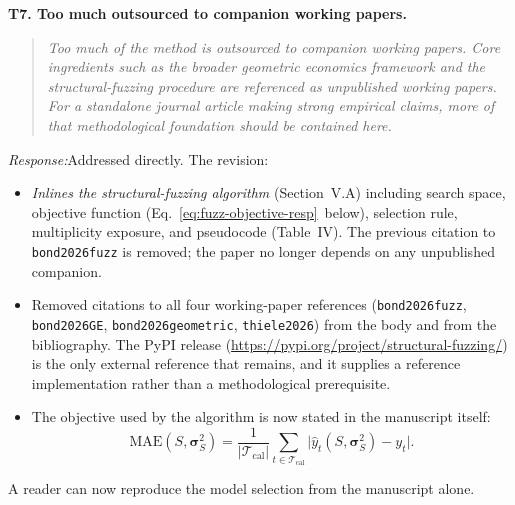\documentclass[11pt]{article}
\newcommand{\rev}[1]{\textbf{#1}}
\newcommand{\resp}{\medskip\noindent\emph{Response:}\quad}
\begin{document}
\rev{T7. Too much outsourced to companion working papers.}
\begin{quote}\itshape\small
Too much of the method is outsourced to companion working papers. Core ingredients such as the broader geometric economics framework and the structural-fuzzing procedure are referenced as unpublished working papers. For a standalone journal article making strong empirical claims, more of that methodological foundation should be contained here.
\end{quote}
\resp Addressed directly. The revision:
\begin{itemize}[leftmargin=*]
  \item \emph{Inlines the structural-fuzzing algorithm} (Section~V.A) including search
        space, objective function (Eq.~\ref{eq:fuzz-objective-resp}~below), selection rule,
        multiplicity exposure, and pseudocode (Table~IV). The previous citation to
        \texttt{bond2026fuzz} is removed; the paper no longer depends on any unpublished
        companion.
  \item Removed citations to all four working-paper references (\texttt{bond2026fuzz},
        \texttt{bond2026GE}, \texttt{bond2026geometric}, \texttt{thiele2026}) from the
        body and from the bibliography. The PyPI release
        (\url{https://pypi.org/project/structural-fuzzing/}) is the only external reference
        that remains, and it supplies a reference implementation rather than a methodological
        prerequisite.
  \item The objective used by the algorithm is now stated in the manuscript itself:
\begin{equation}\label{eq:fuzz-objective-resp}
    \text{MAE}(S,\boldsymbol{\sigma}_S^2)
    = \frac{1}{|\mathcal{T}_{\text{cal}}|}
      \sum_{t\in\mathcal{T}_{\text{cal}}}
      \bigl|\hat{y}_t(S,\boldsymbol{\sigma}_S^2) - y_t\bigr|.
\end{equation}
\end{itemize}
A reader can now reproduce the model selection from the manuscript alone.
\end{document}
